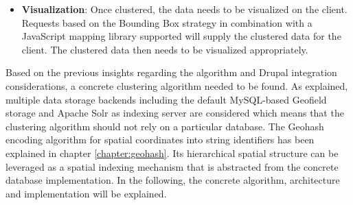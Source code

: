 \begin{itemize}
Two main challenges of integrating a server-side clustering solution with Views have been identified: 1) \textit{allow to inject a custom aggregation implementation}\footnote{\url{http://drupal.org/node/1791796}} and 2) \textit{dealing with geospatially clustered data}\footnote{\url{http://drupal.org/node/1824954}}. The first challenge deals with finding a clean way to integrate a clustering solution into the processing queue of the Views module. The second subsequently deals with challenges that arise when processing and visualizing the clustered data afterwards. As the clustering process changes the data being processed, the implementation needs to take care of involved APIs that work with the changed data. 

Similarly to the previously discussed storage aspect of the Drupal integration, the querying component to account for clustering data in combination with Solr and the Search API.

\item \textbf{Visualization}: Once clustered, the data needs to be visualized on the client. Requests based on the Bounding Box strategy in combination with a JavaScript mapping library supported will supply the clustered data for the client. The clustered data then needs to be visualized appropriately.

\end{itemize}


Based on the previous insights regarding the algorithm and Drupal integration considerations, a concrete clustering algorithm needed to be found. As explained, multiple data storage backends including the default MySQL-based Geofield storage and Apache Solr as indexing server are considered which means that the clustering algorithm should not rely on a particular database. The Geohash encoding algorithm for spatial coordinates into string identifiers has been explained in chapter \ref{chapter:geohash}. Its hierarchical spatial structure can be leveraged as a spatial indexing mechanism that is abstracted from the concrete database implementation. In the following, the concrete algorithm, architecture and implementation will be explained.









